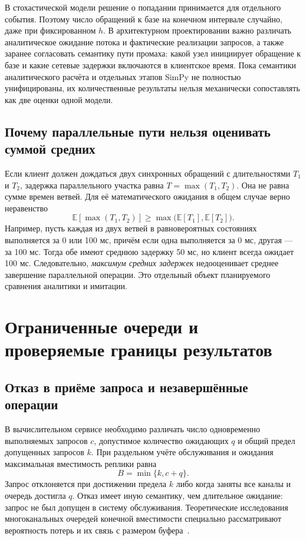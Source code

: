В стохастической модели решение о попадании принимается для отдельного события. Поэтому число обращений к базе на конечном интервале случайно, даже при фиксированном $h$. В архитектурном проектировании важно различать аналитическое ожидание потока и фактические реализации запросов, а также заранее согласовать семантику пути промаха: какой узел инициирует обращение к базе и какие сетевые задержки включаются в клиентское время. Пока семантики аналитического расчёта и отдельных этапов SimPy не полностью унифицированы, их количественные результаты нельзя механически сопоставлять как две оценки одной модели.

\subsection{Почему параллельные пути нельзя оценивать суммой средних}

Если клиент должен дождаться двух синхронных обращений с длительностями $T_1$ и $T_2$, задержка параллельного участка равна $T=\max(T_1,T_2)$. Она не равна сумме времен ветвей. Для её математического ожидания в общем случае верно неравенство
\begin{equation}
\mathbb{E}[\max(T_1,T_2)]\geq
\max\bigl(\mathbb{E}[T_1],\mathbb{E}[T_2]\bigr).
\end{equation}
Например, пусть каждая из двух ветвей в равновероятных состояниях выполняется за 0 или 100 мс, причём если одна выполняется за 0 мс, другая --- за 100 мс. Тогда обе имеют среднюю задержку 50 мс, но клиент всегда ожидает 100 мс. Следовательно, \emph{максимум средних задержек} недооценивает среднее завершение параллельной операции. Это отдельный объект планируемого сравнения аналитики и имитации.

\section{Ограниченные очереди и проверяемые границы результатов}

\subsection{Отказ в приёме запроса и незавершённые операции}

В вычислительном сервисе необходимо различать число одновременно выполняемых запросов $c$, допустимое количество ожидающих $q$ и общий предел допущенных запросов $k$. При раздельном учёте обслуживания и ожидания максимальная вместимость реплики равна
\begin{equation}
B=\min\{k,c+q\}.
\end{equation}
Запрос отклоняется при достижении предела $k$ либо когда заняты все каналы и очередь достигла $q$. Отказ имеет иную семантику, чем длительное ожидание: запрос не был допущен в систему обслуживания. Теоретические исследования многоканальных очередей конечной вместимости специально рассматривают вероятность потерь и их связь с размером буфера~\cite{choi2005finite}.

